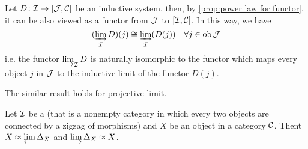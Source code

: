   \begin{ex}
    Let $D\colon{\cal I}\to[{\cal J},{\cal C}]$ be an inductive system, then, by \ref{prop:power law for functor}, it can be also viewed as a functor from ${\cal J}$ to $[{\cal I},{\cal C}]$. In this way, we have
    \begin{equation*}
      (\operatorname*{\underrightarrow{\lim}}_{{\cal I}}D)(j)\cong\operatorname*{\underrightarrow{\lim}}_{{\cal I}}(D(j))\quad\forall j\in\operatorname{ob}{\cal J}
    \end{equation*}
    i.e. the functor $\operatorname*{\underrightarrow{\lim}}_{{\cal I}}D$ is naturally isomorphic to the functor which maps every object $j$ in ${\cal J}$ to the inductive limit of the functor $D(j)$.

    The similar result holds for projective limit.
  \end{ex}

  \begin{ex}
    Let ${\cal I}$ be a  (that is a nonempty category in which every two objects are connected by a zigzag of morphisms) and $X$ be an object in a category ${\cal C}$. Thent $X\approx\operatorname*{\underleftarrow{\lim}}\Delta_X$ and $\operatorname*{\underrightarrow{\lim}}\Delta_X\approx X$.
  \end{ex}

